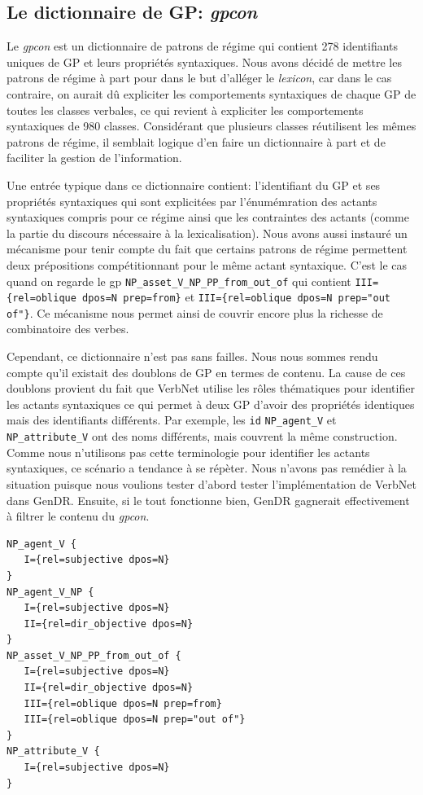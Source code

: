\subsection{Le dictionnaire de \ac{GP}: \emph{gpcon}}
Le \emph{gpcon} est un dictionnaire de patrons de régime qui contient 278 identifiants uniques de \ac{GP} et leurs propriétés syntaxiques. Nous avons décidé de mettre les patrons de régime à part pour dans le but d'alléger le \emph{lexicon}, car dans le cas contraire, on aurait dû expliciter les comportements syntaxiques de chaque \ac{GP} de toutes les classes verbales, ce qui revient à expliciter les comportements syntaxiques de 980 classes. Considérant que plusieurs classes réutilisent les mêmes patrons de régime, il semblait logique d'en faire un dictionnaire à part et de faciliter la gestion de l'information.

Une entrée typique dans ce dictionnaire contient: l'identifiant du \ac{GP} et ses propriétés syntaxiques qui sont explicitées par l'énumémration des actants syntaxiques compris pour ce régime ainsi que les contraintes des actants (comme la partie du discours nécessaire à la lexicalisation). Nous avons aussi instauré un mécanisme pour tenir compte du fait que certains patrons de régime permettent deux prépositions compétitionnant pour le même actant syntaxique. C'est le cas quand on regarde le gp \texttt{NP\_asset\_V\_NP\_PP\_from\_out\_of} qui contient \lstinline|III={rel=oblique dpos=N prep=from}| et \lstinline|III={rel=oblique dpos=N prep="out of"}|. Ce mécanisme nous permet ainsi de couvrir encore plus la richesse de combinatoire des verbes.

Cependant, ce dictionnaire n'est pas sans failles. Nous nous sommes rendu compte qu'il existait des doublons de \ac{GP} en termes de contenu. La cause de ces doublons provient du fait que VerbNet utilise les rôles thématiques pour identifier les actants syntaxiques ce qui permet à deux \ac{GP} d'avoir des propriétés identiques mais des identifiants différents. Par exemple, les \texttt{id} \texttt{NP\_agent\_V} et \texttt{NP\_attribute\_V} ont des noms différents, mais couvrent la même construction. Comme nous n'utilisons pas cette terminologie pour identifier les actants syntaxiques,  ce scénario a tendance à se répèter. Nous n'avons pas remédier à la situation puisque nous voulions tester d'abord tester l'implémentation de VerbNet dans GenDR. Ensuite, si le tout fonctionne bien, GenDR gagnerait effectivement à filtrer le contenu du \emph{gpcon}.

\begin{minipage}{\linewidth}
\begin{lstlisting}[language=XML, caption = Gpcon]
NP_agent_V {
   I={rel=subjective dpos=N}
}
NP_agent_V_NP {
   I={rel=subjective dpos=N}
   II={rel=dir_objective dpos=N}
}
NP_asset_V_NP_PP_from_out_of {
   I={rel=subjective dpos=N}
   II={rel=dir_objective dpos=N}
   III={rel=oblique dpos=N prep=from}
   III={rel=oblique dpos=N prep="out of"}
}
NP_attribute_V {
   I={rel=subjective dpos=N}
}
\end{lstlisting}
\end{minipage}

